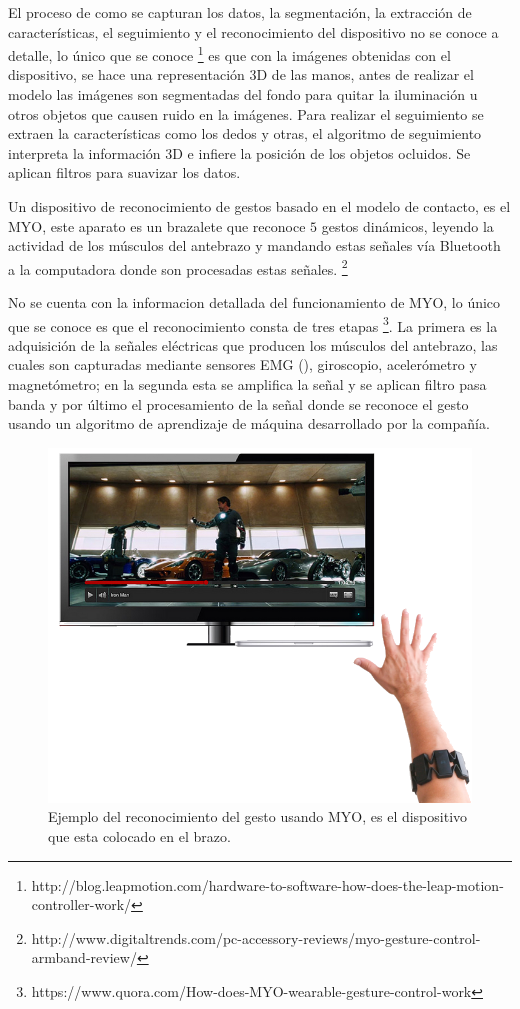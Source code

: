El proceso de como se capturan los datos, la segmentación, la extracción de características, el seguimiento y el reconocimiento del dispositivo no se conoce a detalle, lo único que se conoce \footnote{http://blog.leapmotion.com/hardware-to-software-how-does-the-leap-motion-controller-work/} es que con la imágenes obtenidas con el dispositivo, se hace una representación 3D de las manos, antes de realizar el modelo las imágenes son segmentadas del fondo para quitar la iluminación u otros objetos que causen ruido en la imágenes.
Para realizar el seguimiento se extraen la características como los dedos y otras, el algoritmo de seguimiento interpreta la información 3D e infiere la posición de los objetos ocluidos. Se aplican filtros para suavizar los datos. 


Un dispositivo de reconocimiento de gestos basado en el modelo de contacto, es el MYO, este aparato es un brazalete que reconoce $5$ gestos dinámicos, leyendo la actividad de los músculos del antebrazo y mandando estas señales vía Bluetooth a la computadora donde son procesadas estas señales. \footnote{http://www.digitaltrends.com/pc-accessory-reviews/myo-gesture-control-armband-review/} 

No se cuenta con la informacion detallada del funcionamiento de MYO, lo único que se conoce es que el reconocimiento consta de tres etapas \footnote{https://www.quora.com/How-does-MYO-wearable-gesture-control-work}. La primera es la adquisición de la señales eléctricas que producen los músculos del antebrazo, las cuales son capturadas mediante sensores EMG (), giroscopio, acelerómetro y magnetómetro; en la segunda esta se amplifica la señal y se aplican filtro pasa banda  y por último el procesamiento de la señal donde se reconoce el gesto usando un algoritmo de aprendizaje de máquina desarrollado por la compañía.  

\begin{figure}[h!]
\begin{center}
\includegraphics[scale=.5]{./Figures/MYO.png}
\end{center}
\caption{Ejemplo del reconocimiento del gesto usando MYO, es el dispositivo que esta colocado en el brazo.}
\label{fig:Myo}
\end{figure}

